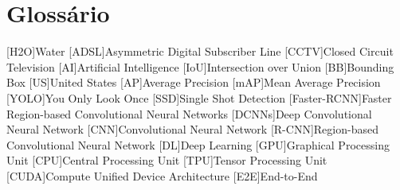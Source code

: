 \chapter{Glossário}

\footnotesize
\SingleSpacing

\begin{multicols}{2}
\begin{acronym}[AAAAAA]

	[H2O]{Water}
	[ADSL]{Asymmetric Digital Subscriber Line}
	[CCTV]{Closed Circuit Television}
	[AI]{Artificial Intelligence}
	[IoU]{Intersection over Union}
	[BB]{Bounding Box}
	[US]{United States}
	[AP]{Average Precision}
	[mAP]{Mean Average Precision}
	[YOLO]{You Only Look Once}
	[SSD]{Single Shot Detection}
	[Faster-RCNN]{Faster Region-based Convolutional Neural Networks}
	[DCNNs]{Deep Convolutional Neural Network}
	[CNN]{Convolutional Neural Network}
	[R-CNN]{Region-based Convolutional Neural Network}
	[DL]{Deep Learning}
	[GPU]{Graphical Processing Unit}
	[CPU]{Central Processing Unit}
	[TPU]{Tensor Processing Unit}
	[CUDA]{Compute Unified Device Architecture}
	[E2E]{End-to-End}
\end{acronym}
\end{multicols}

